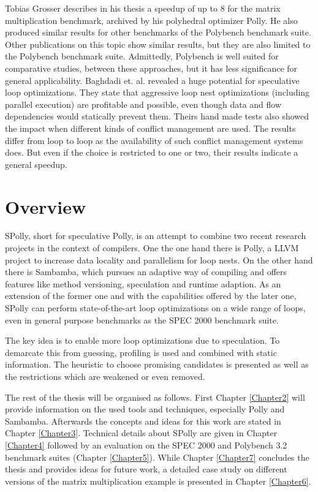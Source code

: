Tobias Grosser describes in his thesis\cite{grosser:thesis} a speedup of up to
$8$ for the matrix multiplication benchmark, archived by his polyhedral optimizer 
Polly\cite{grosser.11.impact}. He also produced similar results for other
benchmarks of the Polybench\cite{Polybench:Online} benchmark suite. 
Other publications on this 
topic\cite{Bondhugula:2008:PAP:1379022.1375595,BCBPR10,Pradelle:2012:PPB:2086696.2086718} 
show similar results, but they are also limited to the Polybench benchmark suite.
Admittedly, Polybench is well suited for comparative studies, between these 
approaches, but it has less significance for general applicability. 
Baghdadi et. al.\cite{BCBPR10} revealed a huge potential for speculative loop 
optimizations. They state that aggressive loop nest optimizations (including 
parallel execution) are profitable and possible, even though data and flow 
dependencies would statically prevent them. 
Theirs hand made tests also showed 
the impact when different kinds of conflict management are used. 
The results differ from loop to loop as the availability of such conflict 
management systems does. But even if the choice is restricted to one or two, 
their results indicate a general speedup. 




\section{Overview}

SPolly, short for speculative Polly,
is an attempt to combine two recent research projects in the context of compilers.
One the one hand there is Polly, a LLVM project to increase data locality
and parallelism for loop nests. On the other hand there is Sambamba, which 
pursues an adaptive way of compiling and offers features like method 
versioning, speculation and runtime adaption. As an extension of the former one
and with the capabilities offered by the later one,
SPolly can perform state-of-the-art loop optimizations on a wide range of loops,
even in general purpose benchmarks as the SPEC 2000 benchmark suite. 

The key idea is to enable more loop optimizations due to speculation.
To demarcate this from guessing, profiling is used and combined with 
static information. The heuristic to choose promising candidates is presented 
as well as the restrictions  which are weakened or even removed. 


The rest of the thesis will be organised as follows. 
First Chapter \ref{Chapter2} will provide information on the used tools and techniques,
especially Polly and Sambamba. Afterwards the concepts and ideas for this work
are stated in Chapter \ref{Chapter3}. 
Technical details about SPolly are given in Chapter \ref{Chapter4} followed by 
an evaluation on the SPEC 2000 and Polybench 3.2 benchmark suites 
(Chapter \ref{Chapter5}). 
While Chapter \ref{Chapter7} concludes the thesis and provides ideas for
future work, a detailed case study on different versions of the matrix 
multiplication example is presented in Chapter \ref{Chapter6}. 

